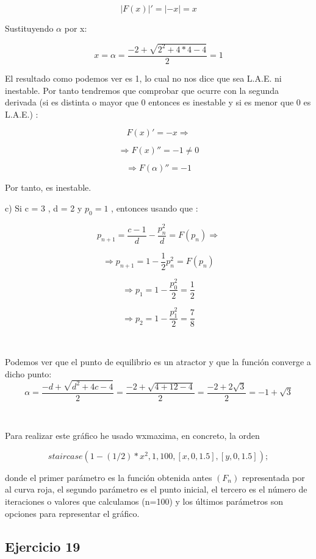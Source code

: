 \documentclass[11pt, a4paper]{article}
\newif\IfInSansMode
\theoremstyle{theorem-style}
\theoremstyle{definition-style}
\theoremstyle{remark-style}
\theoremstyle{example-style}
\begin{document}
    \[
        |F(x)|' = |-x| = x 
    \]

    Sustituyendo $\alpha$ por x:

    \[
        x = \alpha = \frac{-2+\sqrt{2^{2} +4*4-4}}{2} = 1
    \]

    El resultado como podemos ver es 1, lo cual no nos dice que sea L.A.E. ni inestable. Por tanto tendremos que comprobar que ocurre con la segunda derivada (si es distinta o mayor que 0 entonces es inestable y si es menor que 0 es L.A.E.) :

    \[
        F(x)' = -x \Rightarrow
    \]

    \[
        \Rightarrow F(x)'' = -1 \neq 0
    \]

    \[
        \Rightarrow F(\alpha)'' = -1
    \]

    Por tanto, es inestable.

    c) Si c = 3 , d = 2 y $p_0 = 1$ , entonces usando que : 

    \[
        p_{n+1} = \frac{c-1}{d} - \frac{p_{n}^{2}}{d} = F(p_n) \Rightarrow
    \]

    \[
        \Rightarrow p_{n+1} = 1 - \frac{1}{2}p_n^{2} = F(p_n)
    \]

    \[
        \Rightarrow p_1 = 1 - \frac{p_0^{2}}{2} = \frac{1}{2}
    \]

    \[
        \Rightarrow p_2 = 1 - \frac{p_1^{2}}{2} = \frac{7}{8}
    \]

    \

    Podemos ver que el punto de equilibrio es un atractor y que la funci\'on converge a dicho punto:
    \[
        \alpha = \frac{-d+\sqrt{d^{2} +4c-4}}{2} = \frac{-2+\sqrt{4 +12-4}}{2} = \frac{-2+2\sqrt{3}}{2} = -1+\sqrt{3}  
    \]

    \

    Para realizar este gr\'afico he usado wxmaxima, en concreto, la orden 

    \[
        staircase(1-(1/2)*x^2,1,100,[x,0,1.5],[y,0,1.5]);
    \]

    donde el primer parámetro es la función obtenida antes $(F_n)$ representada por al curva roja, el segundo parámetro es el punto inicial, el tercero es el número de iteraciones o valores que calculamos (n=100) y los últimos parámetros son opciones para representar el gráfico.

    \subsection{Ejercicio 19}
\end{document}
